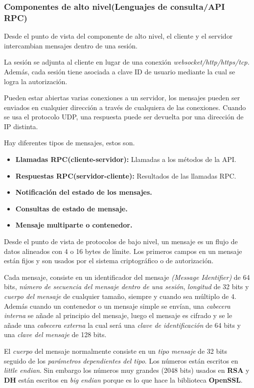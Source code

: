 \subsubsection{Componentes de alto nivel(Lenguajes de consulta/API RPC)}
Desde el punto de vista del componente de alto nivel, el cliente y el servidor intercambian mensajes dentro de una sesión.

La sesión se adjunta al cliente en lugar de una conexión \emph{websocket/http/https/tcp.} 
Además, cada sesión tiene asociada a clave ID de usuario mediante la cual se logra la autorización.

Pueden estar abiertas varias conexiones a un servidor, los mensajes pueden ser enviados en cualquier dirección a través de cualquiera de las conexiones.
Cuando se usa el protocolo UDP, una respuesta puede ser devuelta por una dirección de IP distinta.

Hay diferentes tipos de mensajes, estos son.
\begin{itemize}
		\item \textbf{Llamadas RPC(cliente-servidor):} Llamadas a los métodos de la API.
		\item \textbf{Respuestas RPC(servidor-cliente):} Resultados de las llamadas RPC.
		\item \textbf{Notificación del estado de los mensajes.}
		\item \textbf{Consultas de estado de mensaje.}
		\item \textbf{Mensaje multiparte o contenedor.}
\end{itemize}
Desde el punto de vista de protocolos de bajo nivel, un mensaje es un flujo de datos alineados con 4 o 16 bytes de límite.
Los primeros campos en un mensaje están fijos y son usados por el sistema criptográfico o de autorización.

Cada mensaje, consiste en un identificador del mensaje \emph{(Message Identifier)} de 64 bits, \emph{número de secuencia del mensaje dentro de una sesión}, \emph{longitud} de 32 bits y \emph{cuerpo del mensaje} de cualquier tamaño, siempre y cuando sea múltiplo de 4. 
Además cuando un contenedor o un mensaje simple se envían, una \emph{cabecera interna} se añade al principio del mensaje, luego el mensaje es cifrado y se le añade una \emph{cabecera externa} la cual será una \emph{clave de identificación} de 64 bits y una \emph{clave del mensaje} de 128 bits.

El \emph{cuerpo} del mensaje normalmente consiste en un \emph{tipo mensaje} de 32 bits seguido de los \emph{parámetros dependientes del tipo}.
Los números están escritos en \emph{little endian}. Sin embargo los números muy grandes (2048 bits) usados en \textbf{RSA} y \textbf{DH} están escritos en \emph{big endian} porque es lo que hace la biblioteca \textbf{OpenSSL}.

